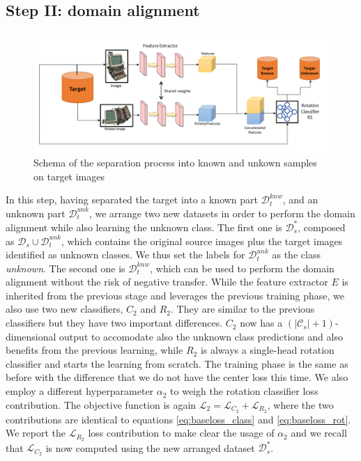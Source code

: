 \documentclass[10pt,twocolumn,letterpaper]{article}
\begin{document}
\subsection{Step II: domain alignment}
\label{sec:domain_alignment}


\begin{figure}[t]
  \includegraphics[trim= 0cm 0cm 0cm 0cm, clip, width=\linewidth ]{scheme.png}
  \caption{\label{fig:separation}\centering Schema of the separation process into known and unkown samples on target images}
\end{figure}


In this step,
having separated the target into a known part $\mathcal{D}_t^{knw}$,
and an unknown part $\mathcal{D}_t^{unk}$,
we arrange two new datasets in order to perform the domain alignment while also learning
the unknown class.
The first one is $\mathcal{D}_s^*$, composed as $\mathcal{D}_s \cup \mathcal{D}_t^{unk}$,
which contains the original source images plus the target images identified as unknown classes.
We thus set the labels for $\mathcal{D}_t^{unk}$ as the class {\it unknown}.
The second one is $\mathcal{D}_t^{knw}$, which can be used to perform the domain alignment
without the risk of negative transfer.
While the feature extractor $E$ is inherited from the previous stage and leverages the previous training phase,
we also use two new classifiers,
$C_2$ and $R_2$.
They are similar to the previous classifiers but they have two important differences.
$C_2$ now has a $(|\mathcal{C}_s|+1)$-dimensional output to accomodate also the unknown class predictions and also
benefits from the previous learning,
while $R_2$ is always a single-head rotation classifier and starts the learning from scratch.
The training phase is the same as before with the difference that we do not have the center loss this time.
We also employ a different hyperparameter $\alpha_2$ to weigh the rotation classifier loss contribution.
The objective function is again $\mathcal{L}_2 = \mathcal{L}_{C_2} + \mathcal{L}_{R_2}$,
where the two contributions are identical to equations \ref{eq:baseloss_class} and \ref{eq:baseloss_rot}.
We report the $\mathcal{L}_{R_2}$ loss contribution to make clear the usage of $\alpha_2$ and we
recall that $\mathcal{L}_{C_2}$ is now computed using the new arranged dataset $\mathcal{D}_s^*$.
\end{document}
